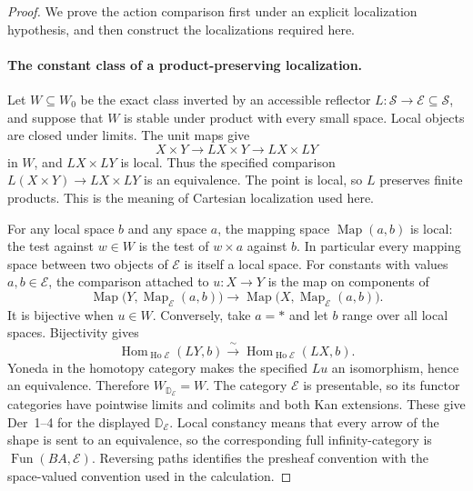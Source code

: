\begin{proof}
We prove the action comparison first under an explicit localization hypothesis, and then construct the localizations required here.

\paragraph{The constant class of a product-preserving localization.}
Let $W\subseteq W_0$ be the exact class inverted by an accessible reflector
$L:\mathcal S\to\mathcal E\subseteq\mathcal S$, and suppose that $W$ is stable under product with every small space. Local objects are closed under limits. The unit maps give
\[
 X\times Y\longrightarrow LX\times Y\longrightarrow LX\times LY
\]
in $W$, and $LX\times LY$ is local. Thus the specified comparison
$L(X\times Y)\to LX\times LY$ is an equivalence. The point is local, so $L$ preserves finite products. This is the meaning of Cartesian localization used here.

For any local space $b$ and any space $a$, the mapping space $\operatorname{Map}(a,b)$ is local: the test against $w\in W$ is the test of $w\times a$ against $b$. In particular every mapping space between two objects of $\mathcal E$ is itself a local space. For constants with values $a,b\in\mathcal E$, the comparison attached to $u:X\to Y$ is the map on components of
\[
 \operatorname{Map}\bigl(Y,\operatorname{Map}_{\mathcal E}(a,b)\bigr)
 \longrightarrow
 \operatorname{Map}\bigl(X,\operatorname{Map}_{\mathcal E}(a,b)\bigr).
\]
It is bijective when $u\in W$. Conversely, take $a=*$ and let $b$ range over all local spaces. Bijectivity gives
\[
 \operatorname{Hom}_{\operatorname{Ho}\mathcal E}(LY,b)
 \xrightarrow{\ \sim\ }
 \operatorname{Hom}_{\operatorname{Ho}\mathcal E}(LX,b).
\]
Yoneda in the homotopy category makes the specified $Lu$ an isomorphism, hence an equivalence. Therefore $W_{\mathbb D_{\mathcal E}}=W$.
The category $\mathcal E$ is presentable, so its functor categories have pointwise limits and colimits and both Kan extensions. These give Der~1--4 for the displayed $\mathbb D_{\mathcal E}$. Local constancy means that every arrow of the shape is sent to an equivalence, so the corresponding full infinity-category is $\operatorname{Fun}(BA,\mathcal E)$. Reversing paths identifies the presheaf convention with the space-valued convention used in the calculation.


\end{proof}
